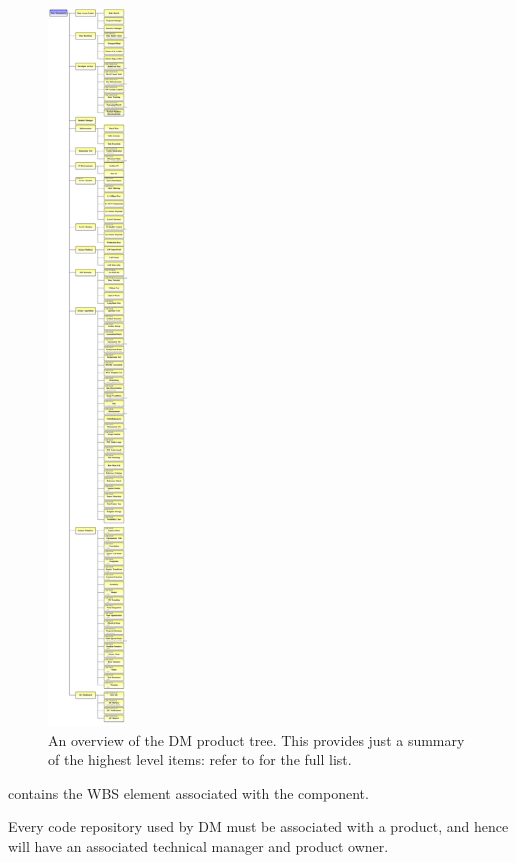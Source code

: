 \begin{figure}[htbp]
	\begin{center}
		 \includegraphics[height=19cm]{ProductTree}
         \caption{An overview of the DM product tree. This provides just a summary of the highest level items: refer to  for the full list.}
         \label{fig:prods}
	 \end{center}
 \end{figure}

 contains the WBS element associated with the component.

Every code repository used by DM must be associated with a product, and hence will have an associated technical manager and product owner.
